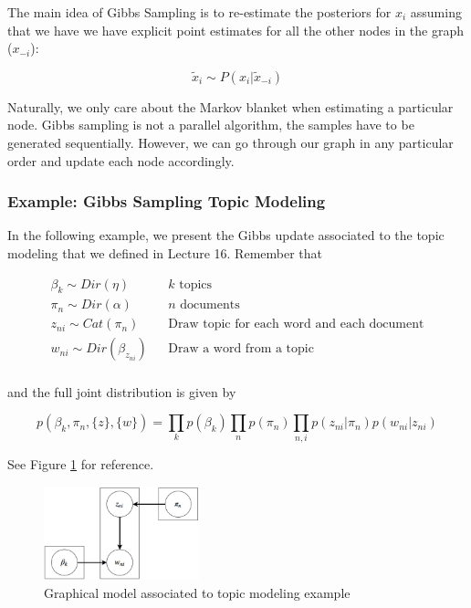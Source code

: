 \documentclass{article}
\begin{document}
The main idea of Gibbs Sampling is to re-estimate the posteriors for $x_i$ assuming that we have we have explicit point estimates for all the other nodes in the graph ($x_{-i}$):

$$\tilde{x}_i \sim P(x_{i} | \tilde{x}_{-i})$$

Naturally, we only care about the Markov blanket when estimating a particular node. Gibbs sampling is not a parallel algorithm, the samples have to be generated sequentially. However, we can go through our graph in any particular order and update each node accordingly. 

\subsubsection{Example: Gibbs Sampling Topic Modeling}

In the following example, we present the Gibbs update associated to the topic modeling that we defined in Lecture 16. Remember that 

\begin{align*}
\beta_k \sim Dir(\eta)& &k\text{ topics} \\
\pi_n \sim Dir(\alpha)& &n\text{ documents} \\
z_{ni} \sim Cat(\pi_n)& &\text{Draw topic for each word and each document} \\
w_{ni} \sim Dir(\beta_{z_{ni	}})& &\text{Draw a word from a topic} \\
\end{align*}

and the full joint distribution is given by 

\begin{equation*}
p(\beta_k, \pi_n, \{z\}, \{w\}) = \prod_{k}{p(\beta_k)}\prod_{n}{p(\pi_n)}\prod_{n,i}{p(z_{ni} | \pi_n){p(w_{ni} | z_{ni})}}
\end{equation*}

See Figure \ref{fig:topic_modeling} for reference. 

\begin{figure}[!ht]
\centering
\includegraphics[width = 0.4\textwidth]{topic_model.pdf}
\caption{Graphical model associated to topic modeling example}
\label{fig:topic_modeling}
\end{figure}
\end{document}
